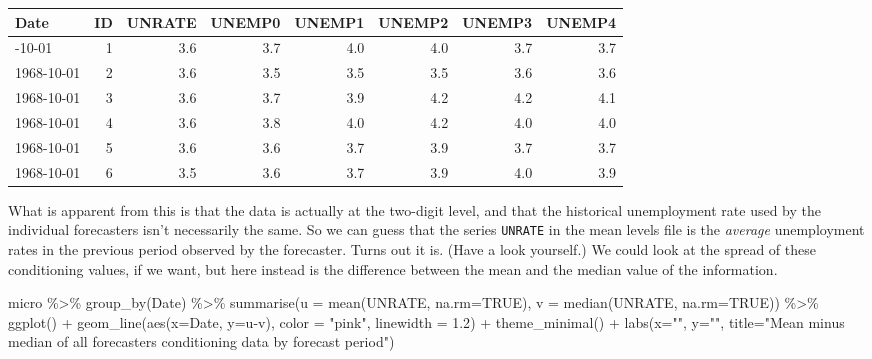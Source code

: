 \documentclass[
  letterpaper,
]{book}
\newenvironment{Shaded}{\begin{snugshade}}{\end{snugshade}}
\newcommand{\AttributeTok}[1]{\textcolor[rgb]{0.40,0.45,0.13}{#1}}
\newcommand{\ConstantTok}[1]{\textcolor[rgb]{0.56,0.35,0.01}{#1}}
\newcommand{\FloatTok}[1]{\textcolor[rgb]{0.68,0.00,0.00}{#1}}
\newcommand{\FunctionTok}[1]{\textcolor[rgb]{0.28,0.35,0.67}{#1}}
\newcommand{\NormalTok}[1]{\textcolor[rgb]{0.00,0.23,0.31}{#1}}
\newcommand{\SpecialCharTok}[1]{\textcolor[rgb]{0.37,0.37,0.37}{#1}}
\newcommand{\StringTok}[1]{\textcolor[rgb]{0.13,0.47,0.30}{#1}}
\begin{document}
\begin{longtable}[]{@{}lrrrrrrr@{}}
\toprule\noalign{}
Date & ID & UNRATE & UNEMP0 & UNEMP1 & UNEMP2 & UNEMP3 & UNEMP4 \\
\midrule\noalign{}
\endhead
\bottomrule\noalign{}
\endlastfoot
1968-10-01 & 1 & 3.6 & 3.7 & 4.0 & 4.0 & 3.7 & 3.7 \\
1968-10-01 & 2 & 3.6 & 3.5 & 3.5 & 3.5 & 3.6 & 3.6 \\
1968-10-01 & 3 & 3.6 & 3.7 & 3.9 & 4.2 & 4.2 & 4.1 \\
1968-10-01 & 4 & 3.6 & 3.8 & 4.0 & 4.2 & 4.0 & 4.0 \\
1968-10-01 & 5 & 3.6 & 3.6 & 3.7 & 3.9 & 3.7 & 3.7 \\
1968-10-01 & 6 & 3.5 & 3.6 & 3.7 & 3.9 & 4.0 & 3.9 \\
\end{longtable}

What is apparent from this is that the data is actually at the two-digit
level, and that the historical unemployment rate used by the individual
forecasters isn't necessarily the same. So we can guess that the series
\texttt{UNRATE} in the mean levels file is the \emph{average}
unemployment rates in the previous period observed by the forecaster.
Turns out it is. (Have a look yourself.) We could look at the spread of
these conditioning values, if we want, but here instead is the
difference between the mean and the median value of the information.

\begin{Shaded}
\begin{Highlighting}[]
\NormalTok{micro }\SpecialCharTok{\%\textgreater{}\%} 
  \FunctionTok{group\_by}\NormalTok{(Date) }\SpecialCharTok{\%\textgreater{}\%} 
  \FunctionTok{summarise}\NormalTok{(}\AttributeTok{u =} \FunctionTok{mean}\NormalTok{(UNRATE, }\AttributeTok{na.rm=}\ConstantTok{TRUE}\NormalTok{), }\AttributeTok{v =} \FunctionTok{median}\NormalTok{(UNRATE, }\AttributeTok{na.rm=}\ConstantTok{TRUE}\NormalTok{)) }\SpecialCharTok{\%\textgreater{}\%}
  \FunctionTok{ggplot}\NormalTok{() }\SpecialCharTok{+}
  \FunctionTok{geom\_line}\NormalTok{(}\FunctionTok{aes}\NormalTok{(}\AttributeTok{x=}\NormalTok{Date, }\AttributeTok{y=}\NormalTok{u}\SpecialCharTok{{-}}\NormalTok{v), }\AttributeTok{color =} \StringTok{"pink"}\NormalTok{, }\AttributeTok{linewidth =} \FloatTok{1.2}\NormalTok{) }\SpecialCharTok{+}
  \FunctionTok{theme\_minimal}\NormalTok{() }\SpecialCharTok{+}
  \FunctionTok{labs}\NormalTok{(}\AttributeTok{x=}\StringTok{""}\NormalTok{, }\AttributeTok{y=}\StringTok{""}\NormalTok{, }\AttributeTok{title=}\StringTok{"Mean minus median of all forecasters\textquotesingle{} conditioning data by forecast period"}\NormalTok{)}
\end{Highlighting}
\end{Shaded}
\end{document}
